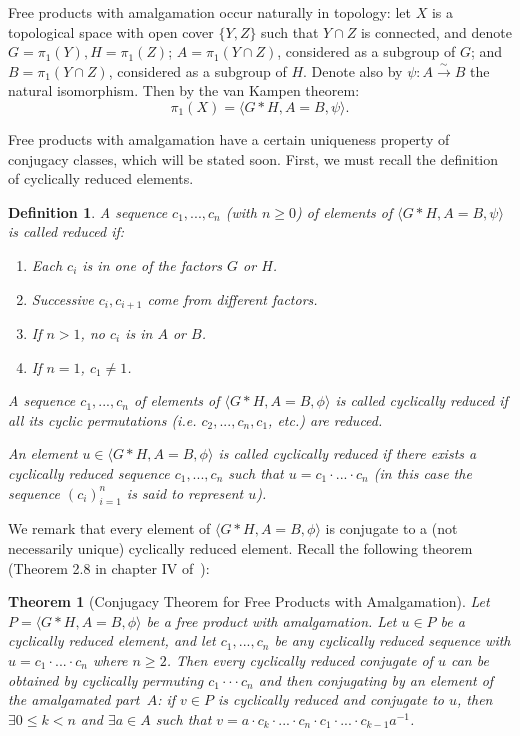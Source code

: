 \documentclass[11pt]{article}
\newtheorem{definition}[theorem]{Definition}
\newtheorem*{theorem*}{Theorem}
\begin{document}
    Free products with amalgamation occur naturally in topology: let $X$ is a topological space with open cover $\{Y,Z\}$ such that $Y \cap Z$ is connected, and denote $G = \pi_1(Y), H = \pi_1(Z)$; $A = \pi_1(Y \cap Z)$, considered as a subgroup of $G$; and $B = \pi_1(Y \cap Z)$, considered as a subgroup of $H$. Denote also by $\psi: A \xrightarrow{\sim} B$ the natural isomorphism. Then by the van Kampen theorem:
    \[
        \pi_1(X) = \langle G * H, A = B, \psi \rangle .
    \]
    
    Free products with amalgamation have a certain uniqueness property of conjugacy classes, which will be stated soon. First, we must recall the definition of cyclically reduced elements.
    
    \begin{definition}
        A sequence $c_1,...,c_n$ (with $n \geq 0$) of elements of $\langle G*H, A=B, \psi \rangle$ is called reduced if:
        \begin{enumerate}
            \item Each $c_i$ is in one of the factors $G$ or $H$.
            \item Successive $c_i,c_{i+1}$ come from different factors.
            \item If $n > 1$, no $c_i$ is in $A$ or $B$.
            \item If $n = 1$, $c_1 \neq 1$.
        \end{enumerate}
        
        A sequence $c_1,...,c_n$ of elements of $\langle G * H, A = B, \phi \rangle$ is called cyclically reduced if all its cyclic permutations (i.e. $c_2,...,c_n,c_1$, etc.) are reduced.
        
        An element $u \in \langle G * H, A = B, \phi \rangle$ is called cyclically reduced if there exists a cyclically reduced sequence $c_1,...,c_n$ such that $u = c_1 \cdot ... \cdot c_n$ (in this case the sequence $(c_i)_{i=1}^n$ is said to represent $u$).
    \end{definition}
    
    We remark that every element of $\langle G * H, A = B, \phi \rangle$ is conjugate to a (not necessarily unique) cyclically reduced element. Recall the following theorem (Theorem 2.8 in chapter IV of~\cite{LS}):
    
    \begin{theorem*}[Conjugacy Theorem for Free Products with Amalgamation]
        Let $P = \langle G * H, A = B, \phi \rangle$ be a free product with amalgamation. Let $u \in P$ be a cyclically reduced element, and let $c_1, ..., c_n$ be any cyclically reduced sequence with $u = c_1 \cdot ... \cdot c_n$ where $n \geq 2$. Then every cyclically reduced conjugate of $u$ can be obtained by cyclically permuting $c_1 \cdot \cdot \cdot c_n$ and then conjugating by an element of the amalgamated part~$A$: if $v \in P$ is cyclically reduced and conjugate to $u$, then $\exists 0 \leq k < n$ and $\exists a \in A$ such that $v = a \cdot c_k \cdot ... \cdot c_n \cdot c_1 \cdot ... \cdot c_{k-1} a^{-1}$.
    \end{theorem*}
    
\end{document}
